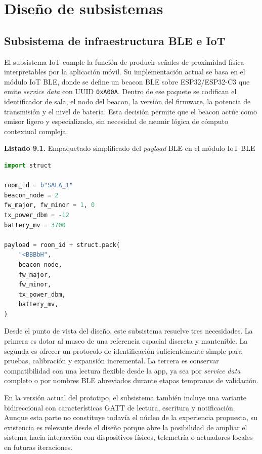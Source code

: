 \section{Diseño de subsistemas}

\subsection{Subsistema de infraestructura BLE e IoT}

El subsistema IoT cumple la función de producir señales de proximidad física interpretables por la aplicación móvil. Su implementación actual se basa en el módulo IoT BLE, donde se define un beacon BLE sobre ESP32/ESP32-C3 que emite \textit{service data} con UUID \texttt{0xA00A}. Dentro de ese paquete se codifican el identificador de sala, el nodo del beacon, la versión del firmware, la potencia de transmisión y el nivel de batería. Esta decisión permite que el beacon actúe como emisor ligero y especializado, sin necesidad de asumir lógica de cómputo contextual compleja.

\begin{center}
\textbf{Listado 9.1.} Empaquetado simplificado del \textit{payload} BLE en el módulo IoT BLE
\end{center}

\begin{lstlisting}[style=codebase,language=Python]
import struct

room_id = b"SALA_1"
beacon_node = 2
fw_major, fw_minor = 1, 0
tx_power_dbm = -12
battery_mv = 3700

payload = room_id + struct.pack(
    "<BBBbH",
    beacon_node,
    fw_major,
    fw_minor,
    tx_power_dbm,
    battery_mv,
)
\end{lstlisting}

Desde el punto de vista del diseño, este subsistema resuelve tres necesidades. La primera es dotar al museo de una referencia espacial discreta y mantenible. La segunda es ofrecer un protocolo de identificación suficientemente simple para pruebas, calibración y expansión incremental. La tercera es conservar compatibilidad con una lectura flexible desde la app, ya sea por \textit{service data} completo o por nombres BLE abreviados durante etapas tempranas de validación.

En la versión actual del prototipo, el subsistema también incluye una variante bidireccional con características GATT de lectura, escritura y notificación. Aunque esta parte no constituye todavía el núcleo de la experiencia propuesta, su existencia es relevante desde el diseño porque abre la posibilidad de ampliar el sistema hacia interacción con dispositivos físicos, telemetría o actuadores locales en futuras iteraciones.

